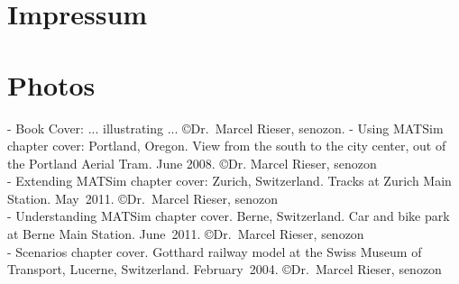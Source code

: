 \section*{Impressum}

\section*{Photos}

- Book Cover: ... illustrating ... \copyright Dr.~Marcel Rieser, \gls{senozon}.
- Using MATSim chapter cover: Portland, Oregon. View from the south to the city center, out of the Portland Aerial Tram. June 2008. \copyright Dr. Marcel Rieser, \gls{senozon}\\
- Extending MATSim chapter cover: Zurich, Switzerland. Tracks at Zurich Main Station. May~2011. \copyright Dr.~Marcel Rieser, \gls{senozon}\\
- Understanding MATSim chapter cover. Berne, Switzerland. Car and bike park at Berne Main Station. June~2011. \copyright Dr.~Marcel Rieser, \gls{senozon}\\
- Scenarios chapter cover. Gotthard railway model at the Swiss Museum of Transport, Lucerne, Switzerland. February~2004. \copyright Dr.~Marcel Rieser, \gls{senozon}\\

